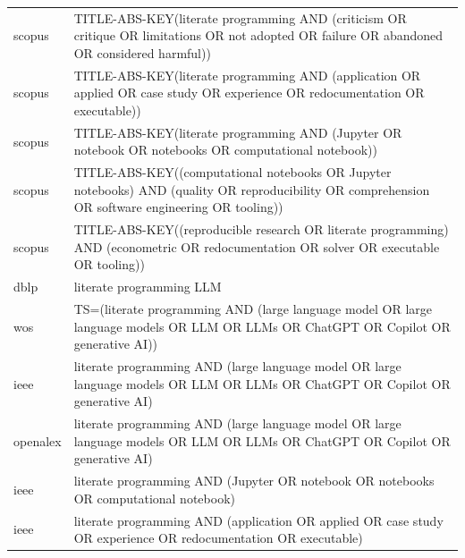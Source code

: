 \documentclass{article}
\begin{document}
\begin{longtable}{lp{10cm}}
scopus & TITLE-ABS-KEY(\textquotedbl{}literate programming\textquotedbl{} AND (criticism OR critique OR limitations OR \textquotedbl{}not adopted\textquotedbl{} OR failure OR abandoned OR \textquotedbl{}considered harmful\textquotedbl{})) \\
scopus & TITLE-ABS-KEY(\textquotedbl{}literate programming\textquotedbl{} AND (application OR applied OR \textquotedbl{}case study\textquotedbl{} OR experience OR redocumentation OR executable)) \\
scopus & TITLE-ABS-KEY(\textquotedbl{}literate programming\textquotedbl{} AND (Jupyter OR notebook OR notebooks OR \textquotedbl{}computational notebook\textquotedbl{})) \\
scopus & TITLE-ABS-KEY((\textquotedbl{}computational notebooks\textquotedbl{} OR \textquotedbl{}Jupyter notebooks\textquotedbl{}) AND (quality OR reproducibility OR comprehension OR \textquotedbl{}software engineering\textquotedbl{} OR tooling)) \\
scopus & TITLE-ABS-KEY((\textquotedbl{}reproducible research\textquotedbl{} OR \textquotedbl{}literate programming\textquotedbl{}) AND (econometric OR redocumentation OR solver OR executable OR tooling)) \\
dblp & literate programming LLM \\
wos & TS=(\textquotedbl{}literate programming\textquotedbl{} AND (\textquotedbl{}large language model\textquotedbl{} OR \textquotedbl{}large language models\textquotedbl{} OR LLM OR LLMs OR ChatGPT OR Copilot OR \textquotedbl{}generative AI\textquotedbl{})) \\
ieee & \textquotedbl{}literate programming\textquotedbl{} AND (\textquotedbl{}large language model\textquotedbl{} OR \textquotedbl{}large language models\textquotedbl{} OR LLM OR LLMs OR ChatGPT OR Copilot OR \textquotedbl{}generative AI\textquotedbl{}) \\
openalex & \textquotedbl{}literate programming\textquotedbl{} AND (\textquotedbl{}large language model\textquotedbl{} OR \textquotedbl{}large language models\textquotedbl{} OR LLM OR LLMs OR ChatGPT OR Copilot OR \textquotedbl{}generative AI\textquotedbl{}) \\
ieee & \textquotedbl{}literate programming\textquotedbl{} AND (Jupyter OR notebook OR notebooks OR \textquotedbl{}computational notebook\textquotedbl{}) \\
ieee & \textquotedbl{}literate programming\textquotedbl{} AND (application OR applied OR \textquotedbl{}case study\textquotedbl{} OR experience OR redocumentation OR executable) \\

\end{longtable}
\end{document}
